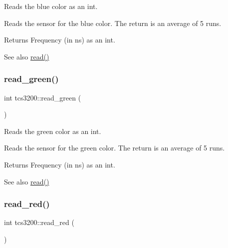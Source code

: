 Reads the blue color as an int. 

Reads the sensor for the blue color. The return is an average of 5 runs. \begin{DoxyReturn}{Returns}
Frequency (in ns) as an int. 
\end{DoxyReturn}
\begin{DoxySeeAlso}{See also}
\hyperlink{classtcs3200_a02b9d9553e97b38bd3aab87bc5ea84b2}{read()} 
\end{DoxySeeAlso}
\mbox{\label{classtcs3200_aab1dcfd5721bd9b8fb4b749e72cefad9}} 
\subsubsection{\texorpdfstring{read\+\_\+green()}{read\_green()}}
{\footnotesize\ttfamily int tcs3200\+::read\+\_\+green (\begin{DoxyParamCaption}{ }\end{DoxyParamCaption})\hspace{0.3cm}{\ttfamily [inline]}}



Reads the green color as an int. 

Reads the sensor for the green color. The return is an average of 5 runs. \begin{DoxyReturn}{Returns}
Frequency (in ns) as an int. 
\end{DoxyReturn}
\begin{DoxySeeAlso}{See also}
\hyperlink{classtcs3200_a02b9d9553e97b38bd3aab87bc5ea84b2}{read()} 
\end{DoxySeeAlso}
\mbox{\label{classtcs3200_a632de7a9235551be40c92c270eb71c99}} 
\subsubsection{\texorpdfstring{read\+\_\+red()}{read\_red()}}
{\footnotesize\ttfamily int tcs3200\+::read\+\_\+red (\begin{DoxyParamCaption}{ }\end{DoxyParamCaption})\hspace{0.3cm}{\ttfamily [inline]}}



